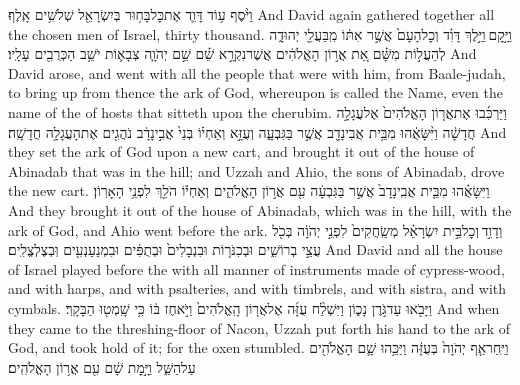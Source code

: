\label{haft_26}
\setcounter{chap}{6}
\setcounter{verse}{1}
{וַיֹּ֨סֶף ע֥וֹד דָּוִ֛ד אֶת\maqqaf כׇּל\maqqaf בָּח֥וּר בְּיִשְׂרָאֵ֖ל שְׁלֹשִׁ֥ים אָֽלֶף׃}
{And David again gathered together all the chosen men of Israel, thirty thousand.}
{וַיָּ֣קׇם \legarmeh  וַיֵּ֣לֶךְ דָּוִ֗ד וְכׇל\maqqaf הָעָם֙ אֲשֶׁ֣ר אִתּ֔וֹ מִֽבַּעֲלֵ֖י יְהוּדָ֑ה לְהַעֲל֣וֹת מִשָּׁ֗ם אֵ֚ת אֲר֣וֹן הָאֱלֹהִ֔ים אֲשֶׁר\maqqaf נִקְרָ֣א שֵׁ֗ם שֵׁ֣ם יְהֹוָ֧ה צְבָא֛וֹת יֹשֵׁ֥ב הַכְּרֻבִ֖ים עָלָֽיו׃}
{And David arose, and went with all the people that were with him, from Baale-judah, to bring up from thence the ark of God, whereupon is called the Name, even the name of the \lord\space of hosts that sitteth upon the cherubim.}
{וַיַּרְכִּ֜בוּ אֶת\maqqaf אֲר֤וֹן הָאֱלֹהִים֙ אֶל\maqqaf עֲגָלָ֣ה חֲדָשָׁ֔ה וַיִּ֨שָּׂאֻ֔הוּ מִבֵּ֥ית אֲבִינָדָ֖ב אֲשֶׁ֣ר בַּגִּבְעָ֑ה וְעֻזָּ֣א וְאַחְי֗וֹ בְּנֵי֙ אֲבִ֣ינָדָ֔ב נֹהֲגִ֖ים אֶת\maqqaf הָעֲגָלָ֥ה חֲדָשָֽׁה׃}
{And they set the ark of God upon a new cart, and brought it out of the house of Abinadab that was in the hill; and Uzzah and Ahio, the sons of Abinadab, drove the new cart.}
{וַיִּשָּׂאֻ֗הוּ מִבֵּ֤ית אֲבִֽינָדָב֙ אֲשֶׁ֣ר בַּגִּבְעָ֔ה עִ֖ם אֲר֣וֹן הָאֱלֹהִ֑ים וְאַחְי֕וֹ הֹלֵ֖ךְ לִפְנֵ֥י הָאָרֽוֹן׃}
{And they brought it out of the house of Abinadab, which was in the hill, with the ark of God, and Ahio went before the ark.}
{וְדָוִ֣ד \legarmeh  וְכׇל\maqqaf בֵּ֣ית יִשְׂרָאֵ֗ל מְשַֽׂחֲקִים֙ לִפְנֵ֣י יְהֹוָ֔ה בְּכֹ֖ל עֲצֵ֣י בְרוֹשִׁ֑ים וּבְכִנֹּר֤וֹת וּבִנְבָלִים֙ וּבְתֻפִּ֔ים וּבִמְנַעַנְעִ֖ים וּֽבְצֶלְצֱלִֽים׃}
{And David and all the house of Israel played before the \lord\space with all manner of instruments made of cypress-wood, and with harps, and with psalteries, and with timbrels, and with sistra, and with cymbals.}
{וַיָּבֹ֖אוּ עַד\maqqaf גֹּ֣רֶן נָכ֑וֹן וַיִּשְׁלַ֨ח עֻזָּ֜ה אֶל\maqqaf אֲר֤וֹן הָֽאֱלֹהִים֙ וַיֹּ֣אחֶז בּ֔וֹ כִּ֥י שָֽׁמְט֖וּ הַבָּקָֽר׃}
{And when they came to the threshing-floor of Nacon, Uzzah put forth his hand to the ark of God, and took hold of it; for the oxen stumbled.}
{וַיִּֽחַר\maqqaf אַ֤ף יְהֹוָה֙ בְּעֻזָּ֔ה וַיַּכֵּ֥הוּ שָׁ֛ם הָאֱלֹהִ֖ים עַל\maqqaf הַשַּׁ֑ל וַיָּ֣מׇת שָׁ֔ם עִ֖ם אֲר֥וֹן הָאֱלֹהִֽים׃}
